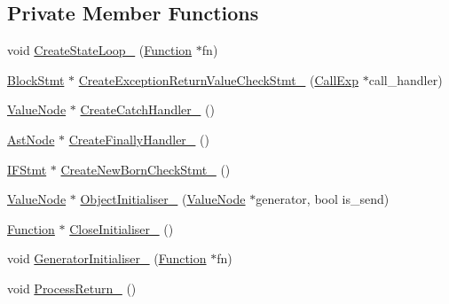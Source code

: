 \subsection*{Private Member Functions}
\begin{DoxyCompactItemize}
\item 
void \hyperlink{classmocha_1_1_generator_helper_af3212e014fa72ff0844b6f329c2320b5}{CreateStateLoop\_\-} (\hyperlink{classmocha_1_1_function}{Function} $\ast$fn)
\item 
\hyperlink{classmocha_1_1_block_stmt}{BlockStmt} $\ast$ \hyperlink{classmocha_1_1_generator_helper_a17d6c4d96924fb5d287084e2daa566d1}{CreateExceptionReturnValueCheckStmt\_\-} (\hyperlink{classmocha_1_1_call_exp}{CallExp} $\ast$call\_\-handler)
\item 
\hyperlink{classmocha_1_1_value_node}{ValueNode} $\ast$ \hyperlink{classmocha_1_1_generator_helper_a76ead268795e9f91d8ec9e749d2f43d1}{CreateCatchHandler\_\-} ()
\item 
\hyperlink{classmocha_1_1_ast_node}{AstNode} $\ast$ \hyperlink{classmocha_1_1_generator_helper_a08ad9c331fff65c0551e29cd53eb0e02}{CreateFinallyHandler\_\-} ()
\item 
\hyperlink{classmocha_1_1_i_f_stmt}{IFStmt} $\ast$ \hyperlink{classmocha_1_1_generator_helper_acc2c40e77cf27d40c812947905c90b30}{CreateNewBornCheckStmt\_\-} ()
\item 
\hyperlink{classmocha_1_1_value_node}{ValueNode} $\ast$ \hyperlink{classmocha_1_1_generator_helper_a820e36ce04f65d7a966067155cfeb798}{ObjectInitialiser\_\-} (\hyperlink{classmocha_1_1_value_node}{ValueNode} $\ast$generator, bool is\_\-send)
\item 
\hyperlink{classmocha_1_1_function}{Function} $\ast$ \hyperlink{classmocha_1_1_generator_helper_af56f7f0253d67cd3d12020b2dde5377c}{CloseInitialiser\_\-} ()
\item 
void \hyperlink{classmocha_1_1_generator_helper_ac8e99c2125c846e70c73a432c27019cc}{GeneratorInitialiser\_\-} (\hyperlink{classmocha_1_1_function}{Function} $\ast$fn)
\item 
void \hyperlink{classmocha_1_1_generator_helper_ad6aeb1a29b126f8960ab0a6052f33697}{ProcessReturn\_\-} ()
\end{DoxyCompactItemize}
